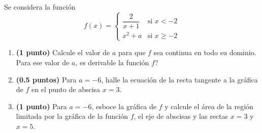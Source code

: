 
Se considera la función
\[
f(x)=\begin{cases}
\dfrac{2}{x+1} & \text{si }x<-2\\[6pt]
x^2+a & \text{si }x\geq -2
\end{cases}
\]
\begin{enumerate}[label=\alph*)]
\item \textbf{(1 punto)} Calcule el valor de $a$ para que $f$ sea continua en todo su dominio. Para ese valor de $a$, \textquestiondown{}es derivable la función $f$?
\item \textbf{(0.5 puntos)} Para $a=-6$, halle la ecuación de la recta tangente a la gráfica de $f$ en el punto de abscisa $x=3$.
\item \textbf{(1 punto)} Para $a=-6$, esboce la gráfica de $f$ y calcule el área de la región limitada por la gráfica de la función $f$, el eje de abscisas y las rectas $x=3$ y $x=5$.
\end{enumerate}
